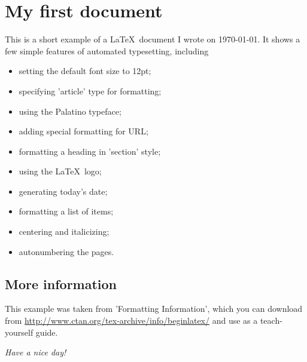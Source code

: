 \documentclass[12pt]{article}
\begin{document}
	\section*{My first document}
	This is a short example of a \LaTeX\ document I wrote on \today. It shows a few simple features of automated typesetting, including
	
	\begin{itemize}
		\item setting the default font size to 12pt;
		\item specifying  'article' type for formatting;
		\item using the Palatino typeface;
		\item adding special formatting for URL;
		\item formatting a heading in 'section' style;
		\item using the \LaTeX\ logo;
		\item generating today's date;
		\item formatting a list of items;
		\item centering and italicizing;
		\item autonumbering the pages.
	\end{itemize}
	
	\subsection*{More information}
	
	This example was taken from 'Formatting Information', which you can download from \url{http://www.ctan.org/tex-archive/info/beginlatex/}
	and use as a teach-yourself guide.
	
	\begin{center}
		\textit{Have a nice day!}
	\end{center}
\end{document}
